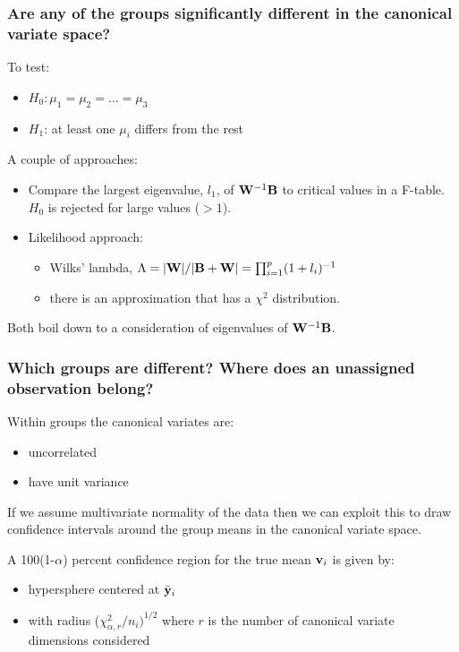 \documentclass{beamer}
\begin{document}
\begin{frame}
  \frametitle{Are any of the groups significantly different in the canonical variate space?}

To test:
\begin{itemize}
\item $H_0: \mu_1 = \mu_2 = \ldots = \mu_3$
\item $H_1$: at least one $\mu_i$ differs from the rest
\end{itemize}

A couple of approaches:
\begin{itemize}
\item  Compare the largest eigenvalue, $l_1$, of $\mathbf{W}^{-1}\mathbf{B}$ to critical values in a F-table. $H_0$ is rejected for large values ($>1$).
\item Likelihood approach:
\begin{itemize}
\item Wilks' lambda, $\Lambda = |\mathbf{W}|/|\mathbf{B} + \mathbf{W}| = \prod_{i=1}^{p} (1 + l_i)^{-1}$
\item there is an approximation that has a $\chi^2$ distribution.
\end{itemize}
\end{itemize}

Both boil down to a consideration of eigenvalues of $\mathbf{W}^{-1}\mathbf{B}$.

\end{frame}


\begin{frame}
  \frametitle{Which groups are different? Where does an unassigned observation belong?}

Within groups the canonical variates are:
\begin{itemize}
\item uncorrelated
\item have unit variance
\end{itemize}

If we assume multivariate normality of the data then we can exploit this to draw confidence intervals around the group means in the canonical variate space.
\smallskip

A 100(1-$\alpha$) percent confidence region for the true mean $\mathbf{v}_i$ is given by:
\begin{itemize}
\item hypersphere centered at $\bar{\mathbf{y}}_i$
\item with radius ($\chi^{2}_{\alpha,r}/n_i)^{1/2}$ where $r$ is the number of canonical variate dimensions considered
\end{itemize}

\end{frame}
\end{document}
